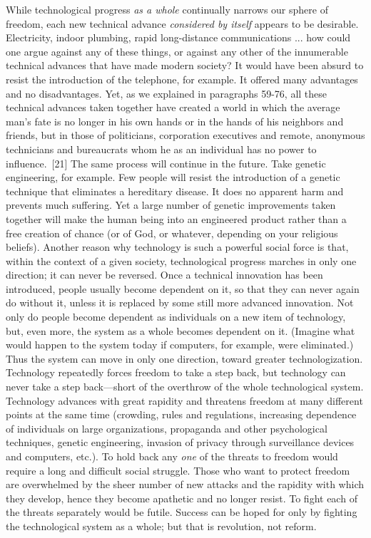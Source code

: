  While technological progress {\em as a whole} continually narrows our sphere of freedom, each new technical advance {\em considered by itself} appears to be desirable. Electricity, indoor plumbing, rapid long-distance communications ... how could one argue against any of these things, or against any other of the innumerable technical advances that have made modern society? It would have been absurd to resist the introduction of the telephone, for example. It offered many advantages and no disadvantages. Yet, as we explained in paragraphs 59-76, all these technical advances taken together have created a world in which the average man’s fate is no longer in his own hands or in the hands of his neighbors and friends, but in those of politicians, corporation executives and remote, anonymous technicians and bureaucrats whom he as an individual has no power to influence.~[21] The same process will continue in the future. Take genetic engineering, for example. Few people will resist the introduction of a genetic technique that eliminates a hereditary disease. It does no apparent harm and prevents much suffering. Yet a large number of genetic improvements taken together will make the human being into an engineered product rather than a free creation of chance (or of God, or whatever, depending on your religious beliefs).\break
{} Another reason why technology is such a powerful social force is that, within the context of a given society, technological progress marches in only one direction; it can never be reversed. Once a technical innovation has been introduced, people usually become dependent on it, so that they can never again do without it, unless it is replaced by some still more advanced innovation. Not only do people become dependent as individuals on a new item of technology, but, even more, the system as a whole becomes dependent on it. (Imagine what would happen to the system today if computers, for example, were eliminated.) Thus the system can move in only one direction, toward greater technologization. Technology repeatedly forces freedom to take a step back, but technology can never take a step back—short of the overthrow of the whole technological system.
 Technology advances with great rapidity and threatens freedom at many different points at the same time (crowding, rules and regulations, increasing dependence of individuals on large organizations, propaganda and other psychological techniques, genetic engineering, invasion of privacy through surveillance devices and computers, etc.). To hold back any {\em one} of the threats to freedom would require a long and difficult social struggle. Those who want to protect freedom are overwhelmed by the sheer number of new attacks and the rapidity with which they develop, hence they become apathetic and no longer resist. To fight each of the threats separately would be futile. Success can be hoped for only by fighting the technological system as a whole; but that is revolution, not reform.\break

